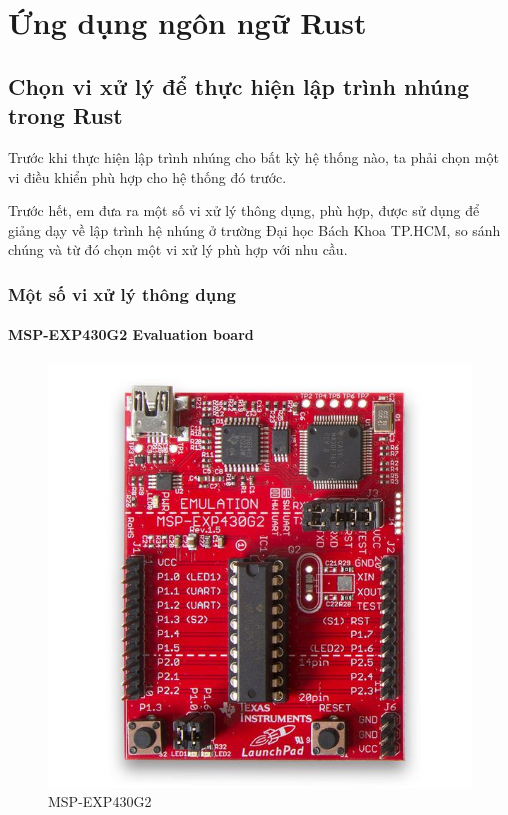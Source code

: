 \chapter{Ứng dụng ngôn ngữ Rust}\label{ch4_application}
\section{Chọn vi xử lý để thực hiện lập trình nhúng trong Rust}
Trước khi thực hiện lập trình nhúng cho bất kỳ hệ thống nào, ta phải chọn một vi điều khiển phù hợp cho hệ thống đó trước.

Trước hết, em đưa ra một số vi xử lý thông dụng, phù hợp, được sử dụng để giảng dạy về lập trình hệ nhúng ở trường Đại học Bách Khoa TP.HCM, so sánh chúng và từ đó chọn một vi xử lý phù hợp với nhu cầu.
\subsection{Một số vi xử lý thông dụng}
\subsubsection{MSP-EXP430G2 Evaluation board}
\begin{figure}[ht]
\centering
\includegraphics[scale=0.35]{images/launchpad-mspexp430g2-02.jpg}
\caption{MSP-EXP430G2}
\end{figure}
\clearpage

